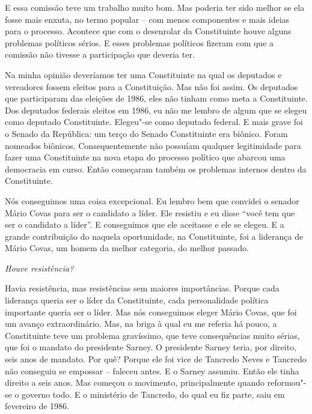 E essa comissão teve um trabalho muito bom. Mas poderia ter sido melhor
se ela fosse mais enxuta, no termo popular -- com menos componentes e
mais ideias para o processo. Acontece que com o desenrolar da
Constituinte houve alguns problemas políticos sérios. E esses problemas
políticos fizeram com que a comissão não tivesse a participação que
deveria ter.

Na minha opinião deveríamos ter uma Constituinte na qual os deputados e
vereadores fossem eleitos para a Constituição. Mas não foi assim. Os
deputados que participaram das eleições de 1986, eles não tinham como
meta a Constituinte. Dos deputados federais eleitos em 1986, eu não me
lembro de algum que se elegeu como deputado Constituinte. Elegeu"-se como
deputado federal. E mais grave foi o Senado da República: um terço do
Senado Constituinte era biônico. Foram nomeados biônicos.
Consequentemente não possuíam qualquer legitimidade para fazer uma
Constituinte na nova etapa do processo político que abarcou uma
democracia em curso. Então começaram também os problemas internos dentro
da Constituinte.

Nós conseguimos uma coisa excepcional. Eu lembro bem que convidei o
senador Mário Covas para ser o candidato a líder. Ele resistiu e eu
disse ``você tem que ser o candidato a líder''. E conseguimos que ele
aceitasse e ele se elegeu. E a grande contribuição do  naquela
oportunidade, na Constituinte, foi a liderança de Mário Covas, um homem
da melhor categoria, do melhor passado.

\medskip

\noindent\emph{Houve resistência?}

Havia resistência, mas resistências sem maiores
importâncias. Porque cada liderança queria ser o líder da Constituinte,
cada personalidade política importante queria ser o líder. Mas nós
conseguimos eleger Mário Covas, que foi um avanço extraordinário. Mas,
na briga à qual eu me referia há pouco, a Constituinte teve um problema
gravíssimo, que teve consequências muito sérias, que foi o mandato do
presidente Sarney. O presidente Sarney teria, por direito, seis anos de
mandato. Por quê? Porque ele foi vice de Tancredo Neves e Tancredo não
conseguiu se empossar -- faleceu antes. E o Sarney assumiu. Então ele
tinha direito a seis anos. Mas começou o movimento, principalmente
quando reformou"-se o governo todo. E o ministério de Tancredo, do qual
eu fiz parte, saiu em fevereiro de 1986.

